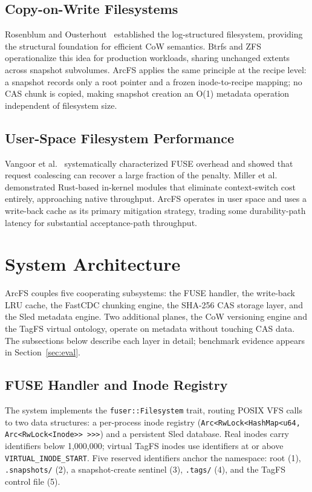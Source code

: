 \documentclass[conference]{IEEEtran}
\begin{document}
\subsection{Copy-on-Write Filesystems}

Rosenblum and Ousterhout~\cite{rosenblum1992lfs} established the
log-structured filesystem, providing the structural foundation for
efficient CoW semantics. Btrfs and ZFS operationalize this idea for
production workloads, sharing unchanged extents across snapshot subvolumes.
ArcFS applies the same principle at the recipe level: a snapshot records
only a root pointer and a frozen inode-to-recipe mapping; no CAS chunk
is copied, making snapshot creation an O(1) metadata operation independent
of filesystem size.

\subsection{User-Space Filesystem Performance}

Vangoor et al.~\cite{vangoor2017fuse} systematically characterized FUSE
overhead and showed that request coalescing can recover a large fraction of
the penalty. Miller et al.~\cite{miller2021bento} demonstrated Rust-based
in-kernel modules that eliminate context-switch cost entirely, approaching
native throughput. ArcFS operates in user space and uses a write-back
cache as its primary mitigation strategy, trading some durability-path
latency for substantial acceptance-path throughput.

\section{System Architecture}

ArcFS couples five cooperating subsystems: the FUSE handler, the write-back
LRU cache, the FastCDC chunking engine, the SHA-256 CAS storage layer, and
the Sled metadata engine. Two additional planes, the CoW versioning engine
and the TagFS virtual ontology, operate on metadata without touching CAS
data. The subsections below describe each layer in detail; benchmark
evidence appears in Section~\ref{sec:eval}.

\subsection{FUSE Handler and Inode Registry}

The system implements the \texttt{fuser::Filesystem} trait, routing POSIX
VFS calls to two data structures: a per-process inode registry
(\texttt{Arc\textless{}RwLock\textless{}HashMap\textless{}u64,
Arc\textless{}RwLock\textless{}Inode\textgreater{}\textgreater{}%
\textgreater{}\textgreater{}\textgreater{}}) and a persistent Sled database.
Real inodes carry identifiers below 1{,}000{,}000; virtual TagFS inodes
use identifiers at or above \texttt{VIRTUAL\_INODE\_START}. Five reserved
identifiers anchor the namespace: root (1), \texttt{.snapshots/} (2), a
snapshot-create sentinel (3), \texttt{.tags/} (4), and the TagFS control
file (5).
\end{document}
